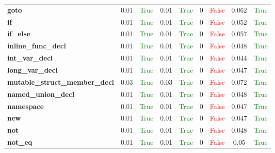 \documentclass{article}
\begin{document}
\begin{xltabular}{\textwidth}{lcccccccc}
\textbf{{\fontsize{10}{12}\selectfont goto}}& 0.01&\textcolor{green}{True}& 0.01&\textcolor{green}{True}& 0&\textcolor{red}{False}& 0.062&\textcolor{green}{True} \\[0.5ex]
\textbf{{\fontsize{10}{12}\selectfont if}}& 0.01&\textcolor{green}{True}& 0.01&\textcolor{green}{True}& 0&\textcolor{red}{False}& 0.052&\textcolor{green}{True} \\[0.5ex]
\textbf{{\fontsize{10}{12}\selectfont if\_else}}& 0.01&\textcolor{green}{True}& 0.01&\textcolor{green}{True}& 0&\textcolor{red}{False}& 0.057&\textcolor{green}{True} \\[0.5ex]
\textbf{{\fontsize{10}{12}\selectfont inline\_func\_decl}}& 0.01&\textcolor{green}{True}& 0.01&\textcolor{green}{True}& 0&\textcolor{red}{False}& 0.048&\textcolor{green}{True} \\[0.5ex]
\textbf{{\fontsize{10}{12}\selectfont int\_var\_decl}}& 0.01&\textcolor{green}{True}& 0.01&\textcolor{green}{True}& 0&\textcolor{red}{False}& 0.044&\textcolor{green}{True} \\[0.5ex]
\textbf{{\fontsize{10}{12}\selectfont long\_var\_decl}}& 0.01&\textcolor{green}{True}& 0.01&\textcolor{green}{True}& 0&\textcolor{red}{False}& 0.047&\textcolor{green}{True} \\[0.5ex]
\textbf{{\fontsize{10}{12}\selectfont mutable\_struct\_member\_decl}}& 0.03&\textcolor{green}{True}& 0.03&\textcolor{green}{True}& 0&\textcolor{red}{False}& 0.072&\textcolor{green}{True} \\[0.5ex]
\textbf{{\fontsize{10}{12}\selectfont named\_union\_decl}}& 0.01&\textcolor{green}{True}& 0.01&\textcolor{green}{True}& 0&\textcolor{red}{False}& 0.048&\textcolor{green}{True} \\[0.5ex]
\textbf{{\fontsize{10}{12}\selectfont namespace}}& 0.01&\textcolor{green}{True}& 0.01&\textcolor{green}{True}& 0&\textcolor{red}{False}& 0.047&\textcolor{green}{True} \\[0.5ex]
\textbf{{\fontsize{10}{12}\selectfont new}}& 0.01&\textcolor{green}{True}& 0.01&\textcolor{green}{True}& 0&\textcolor{red}{False}& 0.047&\textcolor{green}{True} \\[0.5ex]
\textbf{{\fontsize{10}{12}\selectfont not}}& 0.01&\textcolor{green}{True}& 0.01&\textcolor{green}{True}& 0&\textcolor{red}{False}& 0.048&\textcolor{green}{True} \\[0.5ex]
\textbf{{\fontsize{10}{12}\selectfont not\_eq}}& 0.01&\textcolor{green}{True}& 0.01&\textcolor{green}{True}& 0&\textcolor{red}{False}& 0.05&\textcolor{green}{True} \\[0.5ex]

\end{xltabular}
\end{document}
